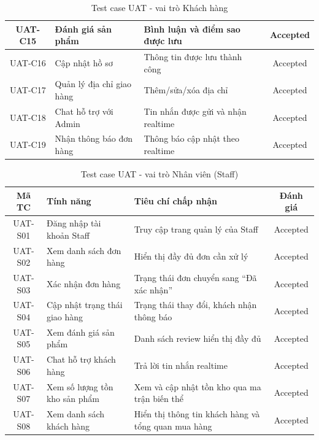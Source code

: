 \begin{table}[H]
\begin{tabular}{|c|p{3.5cm}|p{4.8cm}|c|}
    \hline
    UAT-C15        & Đánh giá sản phẩm         & Bình luận và điểm sao được lưu        & Accepted          \\
    \hline
    UAT-C16        & Cập nhật hồ sơ            & Thông tin được lưu thành công         & Accepted          \\
    \hline
    UAT-C17        & Quản lý địa chỉ giao hàng & Thêm/sửa/xóa địa chỉ                  & Accepted          \\
    \hline
    UAT-C18        & Chat hỗ trợ với Admin     & Tin nhắn được gửi và nhận realtime    & Accepted          \\
    \hline
    UAT-C19        & Nhận thông báo đơn hàng   & Thông báo cập nhật theo realtime      & Accepted          \\
    \hline
  \end{tabular}
  \caption{Test case UAT - vai trò Khách hàng}
\end{table}

\begin{table}[H]
  \centering
  \renewcommand{\arraystretch}{1.3}
  \begin{tabular}{|c|p{3.5cm}|p{4.8cm}|c|}
    \hline
    \textbf{Mã TC} & \textbf{Tính năng}            & \textbf{Tiêu chí chấp nhận}                         & \textbf{Đánh giá} \\
    \hline
    UAT-S01        & Đăng nhập tài khoản Staff     & Truy cập trang quản lý của Staff                    & Accepted          \\
    \hline
    UAT-S02        & Xem danh sách đơn hàng        & Hiển thị đầy đủ đơn cần xử lý                       & Accepted          \\
    \hline
    UAT-S03        & Xác nhận đơn hàng             & Trạng thái đơn chuyển sang ``Đã xác nhận''          & Accepted          \\
    \hline
    UAT-S04        & Cập nhật trạng thái giao hàng & Trạng thái thay đổi, khách nhận thông báo           & Accepted          \\
    \hline
    UAT-S05        & Xem đánh giá sản phẩm         & Danh sách review hiển thị đầy đủ                    & Accepted          \\
    \hline
    UAT-S06        & Chat hỗ trợ khách hàng        & Trả lời tin nhắn realtime                           & Accepted          \\
    \hline
    UAT-S07        & Xem số lượng tồn kho sản phẩm & Xem và cập nhật tồn kho qua ma trận biến thể        & Accepted          \\
    \hline
    UAT-S08        & Xem danh sách khách hàng      & Hiển thị thông tin khách hàng và tổng quan mua hàng & Accepted          \\
    \hline
  \end{tabular}
  \caption{Test case UAT - vai trò Nhân viên (Staff)}
\end{table}


